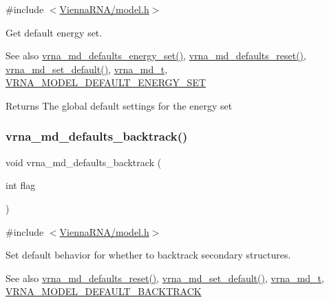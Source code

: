 {\ttfamily \#include $<$\mbox{\hyperlink{model_8h}{Vienna\+R\+N\+A/model.\+h}}$>$}



Get default energy set. 

\begin{DoxySeeAlso}{See also}
\mbox{\hyperlink{group__model__details_ga8dd29c55787a4576277e1907e92d810c}{vrna\+\_\+md\+\_\+defaults\+\_\+energy\+\_\+set()}}, \mbox{\hyperlink{group__model__details_ga70834424cf804d149937de89f80ceb45}{vrna\+\_\+md\+\_\+defaults\+\_\+reset()}}, \mbox{\hyperlink{group__model__details_ga8ac6ff84936282436f822644bf841f66}{vrna\+\_\+md\+\_\+set\+\_\+default()}}, \mbox{\hyperlink{group__model__details_ga1f8a10e12a0a1915f2a4eff0b28ea17c}{vrna\+\_\+md\+\_\+t}}, \mbox{\hyperlink{group__model__details_ga6fcf6b2d0f89256cdbd166486c9b6e1e}{V\+R\+N\+A\+\_\+\+M\+O\+D\+E\+L\+\_\+\+D\+E\+F\+A\+U\+L\+T\+\_\+\+E\+N\+E\+R\+G\+Y\+\_\+\+S\+ET}} 
\end{DoxySeeAlso}
\begin{DoxyReturn}{Returns}
The global default settings for the energy set 
\end{DoxyReturn}
\mbox{\label{group__model__details_ga978c468b2fe96a70d5191e3dd17d5599}} 
\subsubsection{\texorpdfstring{vrna\_md\_defaults\_backtrack()}{vrna\_md\_defaults\_backtrack()}}
{\footnotesize\ttfamily void vrna\+\_\+md\+\_\+defaults\+\_\+backtrack (\begin{DoxyParamCaption}\item[{int}]{flag }\end{DoxyParamCaption})}



{\ttfamily \#include $<$\mbox{\hyperlink{model_8h}{Vienna\+R\+N\+A/model.\+h}}$>$}



Set default behavior for whether to backtrack secondary structures. 

\begin{DoxySeeAlso}{See also}
\mbox{\hyperlink{group__model__details_ga70834424cf804d149937de89f80ceb45}{vrna\+\_\+md\+\_\+defaults\+\_\+reset()}}, \mbox{\hyperlink{group__model__details_ga8ac6ff84936282436f822644bf841f66}{vrna\+\_\+md\+\_\+set\+\_\+default()}}, \mbox{\hyperlink{group__model__details_ga1f8a10e12a0a1915f2a4eff0b28ea17c}{vrna\+\_\+md\+\_\+t}}, \mbox{\hyperlink{group__model__details_ga3fda8006ab84baf817bd8e5ccbc6bb35}{V\+R\+N\+A\+\_\+\+M\+O\+D\+E\+L\+\_\+\+D\+E\+F\+A\+U\+L\+T\+\_\+\+B\+A\+C\+K\+T\+R\+A\+CK}} 
\end{DoxySeeAlso}

